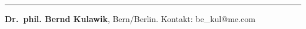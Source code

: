 \begin{center}\rule{0.5\linewidth}{0.5pt}\end{center}

\textbf{Dr.~phil. Bernd Kulawik}, Bern/Berlin. Kontakt: be\_kul@me.com
